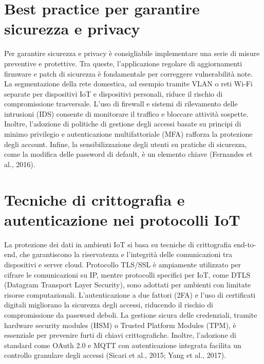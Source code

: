\section{Best practice per garantire sicurezza e privacy}
Per garantire sicurezza e privacy è consigliabile implementare una serie di misure preventive e protettive. Tra queste, l'applicazione regolare di aggiornamenti firmware e patch di sicurezza è fondamentale per correggere vulnerabilità note. La segmentazione della rete domestica, ad esempio tramite VLAN o reti Wi-Fi separate per dispositivi IoT e dispositivi personali, riduce il rischio di compromissione trasversale. L'uso di firewall e sistemi di rilevamento delle intrusioni (IDS) consente di monitorare il traffico e bloccare attività sospette. Inoltre, l'adozione di politiche di gestione degli accessi basate su principi di minimo privilegio e autenticazione multifattoriale (MFA) rafforza la protezione degli account. Infine, la sensibilizzazione degli utenti su pratiche di sicurezza, come la modifica delle password di default, è un elemento chiave (Fernandes et al., 2016).

\section{Tecniche di crittografia e autenticazione nei protocolli IoT}
La protezione dei dati in ambienti IoT si basa su tecniche di crittografia end-to-end, che garantiscono la riservatezza e l'integrità delle comunicazioni tra dispositivi e server cloud. Protocollo TLS/SSL è ampiamente utilizzato per cifrare le comunicazioni su IP, mentre protocolli specifici per IoT, come DTLS (Datagram Transport Layer Security), sono adottati per ambienti con limitate risorse computazionali. L'autenticazione a due fattori (2FA) e l'uso di certificati digitali migliorano la sicurezza degli accessi, riducendo il rischio di compromissione da password deboli. La gestione sicura delle credenziali, tramite hardware security modules (HSM) o Trusted Platform Modules (TPM), è essenziale per prevenire furti di chiavi crittografiche. Inoltre, l'adozione di standard come OAuth 2.0 e MQTT con autenticazione integrata facilita un controllo granulare degli accessi (Sicari et al., 2015; Yang et al., 2017).

